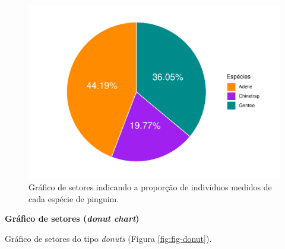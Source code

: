 \documentclass[
]{article}
\begin{document}
\begin{figure}
\includegraphics[width=0.75\linewidth,height=0.75\textheight]{epr_files/figure-latex/fig-pie-1} \caption{Gráfico de setores indicando a proporção de indivíduos medidos de cada espécie de pinguim.}\label{fig:fig-pie}
\end{figure}

\textbf{Gráfico de setores (\emph{donut chart})}

Gráfico de setores do tipo \emph{donuts} (Figura \ref{fig:fig-donut}).
\end{document}
